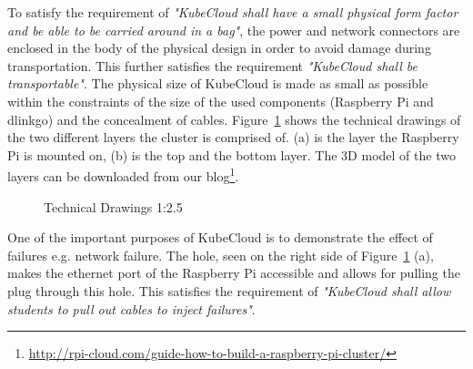 \noindent
To satisfy the requirement of \textit{"KubeCloud shall have a small physical form factor and be able to be carried around in a bag"}, the power and network connectors are enclosed in the body of the physical design in order to avoid damage during transportation. This further satisfies the requirement \textit{"KubeCloud shall be transportable"}.
The physical size of KubeCloud is made as small as possible within the constraints of the size of the used components (Raspberry Pi and dlinkgo) and the concealment of cables. Figure~\ref{fig:technical_drawings} shows the technical drawings of the two different layers the cluster is comprised of. (a) is the layer the Raspberry Pi is mounted on, (b) is the top and the bottom layer. The 3D model of the two layers can be downloaded from our blog\footnote{\url{http://rpi-cloud.com/guide-how-to-build-a-raspberry-pi-cluster/}}.

\begin{figure}[H]%
    \centering
    \qquad
    \caption{Technical Drawings 1:2.5}%
    \label{fig:technical_drawings}%
\end{figure}

\noindent
One of the important purposes of KubeCloud is to demonstrate the effect of failures e.g. network failure. The hole, seen on the right side of Figure~\ref{fig:technical_drawings} (a), makes the ethernet port of the Raspberry Pi accessible and allows for pulling the plug through this hole. This satisfies the requirement of \textit{"KubeCloud shall allow students to pull out cables to inject failures"}.
